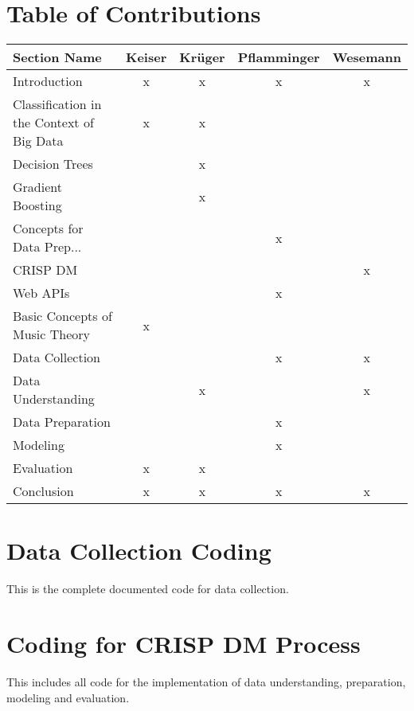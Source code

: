 \section{Table of Contributions}

\begin{table}[H]
\begin{tabular}{lcccc}
\toprule
Section Name & Keiser & Krüger & Pflamminger & Wesemann  \\ 
\midrule
Introduction                                    & x & x & x & x \\
Classification in the Context of Big Data         & x & x &   &   \\
Decision Trees                                  &   & x &   &   \\
Gradient Boosting                               &   & x &   &   \\
Concepts for Data Prep...      &   &   & x &   \\
CRISP DM &   &   &   & x \\
Web APIs          &   &   & x &   \\
Basic Concepts of Music Theory                  & x &   &   &   \\
Data Collection                                 &   &   & x & x \\
Data Understanding                              &   & x &   & x \\
Data Preparation                                &   &   & x &   \\
Modeling                                        &   &   & x &   \\
Evaluation                                      & x & x &   &   \\
Conclusion                                      & x & x & x & x \\
\bottomrule
\end{tabular}
\end{table}

\newpage
\section{Data Collection Coding}
This is the complete documented code for data collection.
\label{sec:appendix_data_collection}


\newpage
\section{Coding for CRISP DM Process}
\label{sec:appendix_crisp_dm}
This includes all code for the implementation of data understanding, preparation,
modeling and evaluation.

